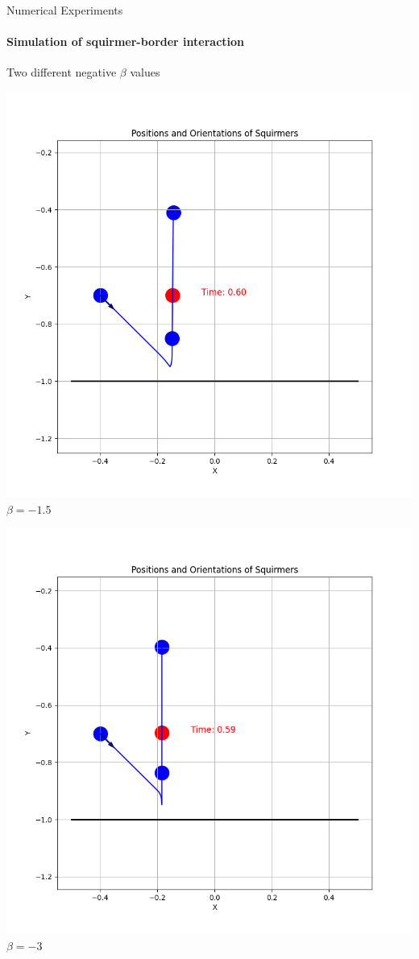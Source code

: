 \documentclass{beamer}
\begin{document}
\begin{frame}{Numerical Experiments}
    \framesubtitle{Simulation of squirmer-border interaction}
    \begin{center}
        Two different negative $\beta$ values
    \end{center}
    \begin{minipage}{0.49\textwidth}
        \centering
        \includegraphics[width=1\textwidth]{../../graphs/simulations/border/betam1_5/mpi_4.png}
        $\beta = -1.5$
    \end{minipage}
    \begin{minipage}{0.49\textwidth}
        \centering
        \includegraphics[width=1\textwidth]{../../graphs/simulations/border/betam3/mpi_4.png}
        $\beta = -3$
    \end{minipage}
\end{frame}
\end{document}
